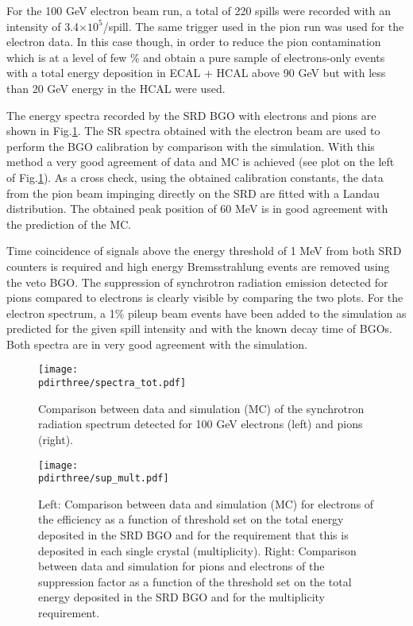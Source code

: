 For the 100 GeV electron beam run, a total of 220 spills were recorded with an intensity of 3.4$\times 10^5$/spill. 
The same trigger used in the pion run was used for the electron data.
In this case though, in order to reduce the pion contamination which is at a level of few \% and obtain a pure sample of electrons-only events with a total energy deposition in ECAL + HCAL above 90 GeV but with less than 20 GeV energy in the HCAL were used.  


The energy spectra recorded by the SRD BGO with electrons and pions are shown in Fig.\ref{fig:comp_spectra}. The SR spectra obtained with the electron beam are used to perform the BGO calibration by comparison with the simulation. With this method a very good agreement of data and MC is achieved (see plot on the left of Fig.\ref{fig:comp_spectra}). As a cross check, using the obtained calibration constants, the data from the pion beam impinging directly on the SRD are fitted with a Landau distribution. The obtained peak position of 60 MeV is in good agreement with the prediction of the MC. 

Time coincidence of signals above the energy threshold of 1 MeV from both SRD counters is required and high energy Bremsstrahlung events are removed using the veto BGO.
The suppression of synchrotron radiation emission detected for pions compared to electrons is clearly visible by comparing the two plots. For the electron spectrum, a 1\% pileup beam events have been added to the simulation as predicted for the given spill intensity and with the known decay time of BGOs.  Both spectra are in very good agreement with the simulation.

\begin{figure}[htb!]
  \centering
  \texttt{[image: \\pdirthree/spectra\_tot.pdf]}
  \caption[SRD comparison between data and MC]{Comparison between data and simulation (MC) of the synchrotron radiation spectrum detected for 100 GeV electrons (left) and pions (right). }
  \label{fig:comp_spectra}
\end{figure} 

\begin{figure}[htb!]
  \centering
  \texttt{[image: \\pdirthree/sup\_mult.pdf]}
  \caption[efficiency and rejection power of the SRD cut]{Left: Comparison between data and simulation (MC) for electrons of the efficiency as a function of threshold set on the total energy deposited in the SRD BGO and for the requirement that this is deposited in each single crystal (multiplicity). Right: Comparison between data and simulation for pions and electrons of the suppression factor as a function of the threshold set on the total energy deposited in the SRD BGO and for the multiplicity requirement.}
  \label{fig:sup_mult}
\end{figure}

